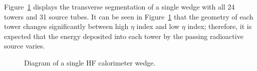 Figure~\ref{fig:hf_description_wedgediagram} displays the transverse segmentation of a single wedge with all 24 towers and 31 source tubes. It can be seen in Figure~\ref{fig:hf_description_wedgediagram} that the geometry of each tower changes significantly between high $\eta$ index and low $\eta$ index; therefore, it is expected that the energy deposited into each tower by the passing radioactive source varies.
\begin{figure}[H]
   \begin{center}
      \caption{Diagram of a single HF calorimeter wedge.}
      \label{fig:hf_description_wedgediagram}
   \end{center}
\end{figure}

